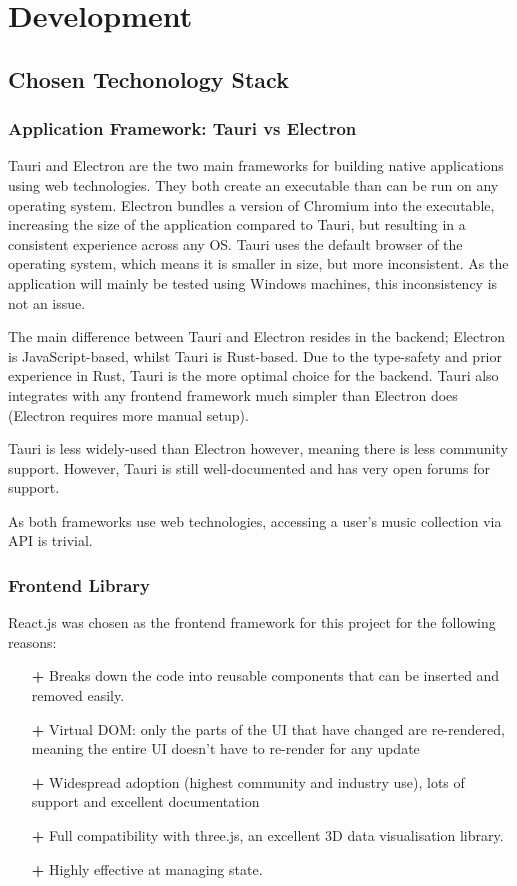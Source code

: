 \chapter{Development}
\section{Chosen Techonology Stack}
\subsection{Application Framework: Tauri vs Electron}
Tauri and Electron are the two main frameworks for building native applications using web technologies. They both create an executable than can be run on any operating system. Electron bundles a version of Chromium into the executable, increasing the size of the application compared to Tauri, but resulting in a consistent experience across any OS. Tauri uses the default browser of the operating system, which means it is smaller in size, but more inconsistent. As the application will mainly be tested using Windows machines, this inconsistency is not an issue.

The main difference between Tauri and Electron resides in the backend; Electron is JavaScript-based, whilst Tauri is Rust-based. Due to the type-safety and prior experience in Rust, Tauri is the more optimal choice for the backend. Tauri also integrates with any frontend framework much simpler than Electron does (Electron requires more manual setup). 

Tauri is less widely-used than Electron however, meaning there is less community support. However, Tauri is still well-documented and has very open forums for support.

As both frameworks use web technologies, accessing a user's music collection via API is trivial.

\subsection{Frontend Library}
React.js was chosen as the frontend framework for this project for the following reasons:\begin{itemize}
    \item[\textbf{+}] Breaks down the code into reusable components that can be inserted and removed easily.
    \item[\textbf{+}] Virtual DOM: only the parts of the UI that have changed are re-rendered, meaning the entire UI doesn't have to re-render for any update
    \item[\textbf{+}] Widespread adoption (highest community and industry use), lots of support and excellent documentation
    \item[\textbf{+}] Full compatibility with three.js, an excellent 3D data visualisation library.
    \item[\textbf{+}] Highly effective at managing state.
\end{itemize}

